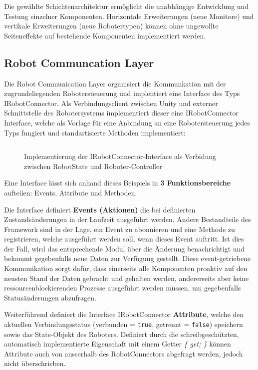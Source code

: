 Die gewählte Schichtenarchitektur ermöglicht die unabhängige Entwicklung und
Testung einzelner Komponenten. Horizontale Erweiterungen (neue Monitore) und
vertikale Erweiterungen (neue Robotertypen) können ohne ungewollte Seiteneffekte auf
bestehende Komponenten implementiert werden.


\subsection{Robot Communcation Layer}
Die Robot Communication Layer organisiert die Kommunkation mit der zugrundeliegenden Robotersteuerung und
implentiert eine Interface des Typs IRobotConnector. Als Verbindungsclient
zwischen Unity und externer Schnittstelle des Robotersystems implementiert
dieser eine IRobotConnector Interface, welche als Vorlage für eine Anbindung an
eine Robotersteuerung jedes Typs fungiert und standartisierte Methoden
implementiert:

\begin{figure}[H]
	\inputminted[fontsize=\footnotesize]{csharp}{code-snippets/IRobotConnector.cs}
	\caption{Implementierung der IRobotConnector-Interface als Verbidung zwischen
		RobotState und Roboter-Controller}
\end{figure}

Eine Interface lässt sich anhand dieses Beispiels in \textbf{3
	Funktionsbereiche} aufteilen: Events, Attribute und Methoden.


Die Interface definiert \textbf{Events (Aktionen)} die bei definierten Zustandsänderungen
in der Laufzeit ausgeführt werden. Andere Bestandteile des Framework sind in der
Lage, ein Event zu abonnieren und eine Methode zu registrieren, welche ausgeführt
werden soll, wenn dieses Event auftritt. Ist dies der Fall, wird das
entsprechende Modul über die Änderung benachrichtigt und bekommt gegebenfalls
neue Daten zur Verfügung gestellt. Diese event-getriebene Kommunikation sorgt
dafür, dass einerseits alle Komponenten proaktiv auf den neusten Stand der Daten gebracht
und gehalten werden, andererseits aber keine ressourcenblockierenden Prozesse
ausgeführt werden müssen, um gegebenfalls Statusänderungen abzufragen.


Weiterführend definiert die Interface IRobotConnector \textbf{Attribute}, welche den
aktuellen Verbindungsstatus (verbunden = \texttt{true}, getrennt = \texttt{false}) speichern sowie das
State-Objekt des Roboters. Definiert durch die schreibgeschützten, automatisch
implementierte Eigenschaft mit einem Getter \textit{\{ get; \}} können Attribute
auch von ausserhalb des RobotConnectors abgefragt werden, jedoch nicht
überschrieben.



